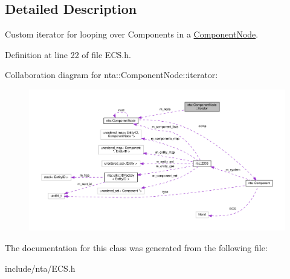 \subsection{Detailed Description}
Custom iterator for looping over Components in a \hyperlink{structnta_1_1ComponentNode}{Component\+Node}. 

Definition at line 22 of file E\+C\+S.\+h.



Collaboration diagram for nta\+:\+:Component\+Node\+:\+:iterator\+:\nopagebreak
\begin{figure}[H]
\begin{center}
\leavevmode
\includegraphics[width=350pt]{de/db4/classnta_1_1ComponentNode_1_1iterator__coll__graph}
\end{center}
\end{figure}


The documentation for this class was generated from the following file\+:\begin{DoxyCompactItemize}
\item 
include/nta/E\+C\+S.\+h\end{DoxyCompactItemize}
